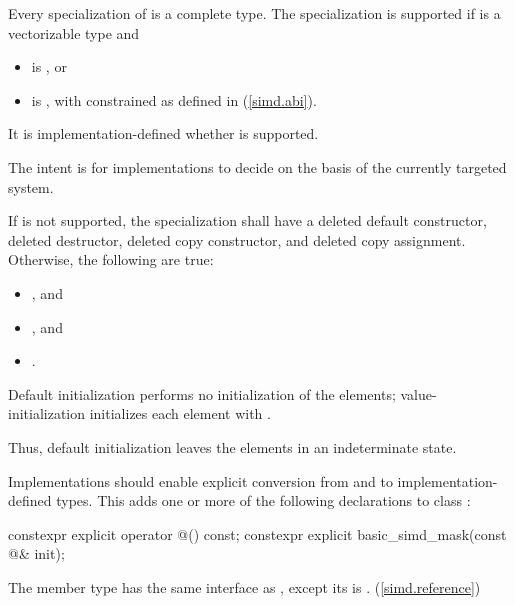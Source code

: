 \pnum
Every specialization of  is a complete type. The specialization  is supported if  is a vectorizable type and
\begin{itemize}
  \item {} is , or
  \item {} is , with  constrained as defined in (\ref{simd.abi}).
\end{itemize}

It is implementation-defined whether  is supported.
\begin{note}The intent is for implementations to decide on the basis of the currently targeted system.\end{note}

If  is not supported, the specialization shall have a deleted default constructor, deleted destructor, deleted copy constructor, and deleted copy assignment.
Otherwise, the following are true:
\begin{itemize}
  \item {}, and
  \item {}, and
  \item {}.
\end{itemize}

\pnum
Default initialization performs no initialization of the elements; value-initialization initializes each element with . \begin{note}Thus, default initialization leaves the elements in an indeterminate state.\end{note}

\pnum
Implementations should enable explicit conversion from and to implementation-defined types. This adds one or more of the following declarations to class :

\begin{codeblock}
constexpr explicit operator @\impdef@() const;
constexpr explicit basic_simd_mask(const @\impdef@& init);
\end{codeblock}

\pnum
The member type  has the same interface as , except its  is . (\ref{simd.reference})

